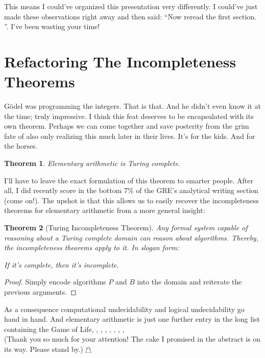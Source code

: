 \documentclass{article}
\newtheorem{theorem}{Theorem}
\begin{document}
This means I could've organized this presentation very differently. I could've just made these observations right away and then said: ``Now reread the first section. \scalebox{0.9}{$\square$}''. I've been wasting your time!

\section{Refactoring The Incompleteness Theorems}

Gödel was programming the integers. That is that. And he didn't even know it at the time; truly impressive. I think this feat deserves to be encapsulated with its own theorem. Perhaps we can come together and save posterity from the grim fate of also only realizing this much later in their lives. It's for the kids. And for the horses.

\begin{theorem}
Elementary arithmetic is Turing complete.
\end{theorem}

I'll have to leave the exact formulation of this theorem to smarter people. After all, I did recently score in the bottom 7\% of the GRE's analytical writing section (come on!). The upshot is that this allows us to easily recover the incompleteness theorems for elementary arithmetic from a more general insight:

\begin{theorem}[Turing Incompleteness Theorem]
Any formal system capable of reasoning about a Turing complete domain can reason about algorithms. Thereby, the incompleteness theorems apply to it. In slogan form: 
\begin{center}
If it's complete, then it's incomplete.
\end{center}
\end{theorem}

\begin{proof}
Simply encode algorithms $P$ and $B$ into the domain and reiterate the previous arguments.
\end{proof}

As a consequence computational undecidability and logical undecidability go hand in hand. And elementary arithmetic is just one further entry in the long list containing the Game of Life, \scalebox{0.95}{Fractran}, \scalebox{0.9}{Post Tag Systems}, \scalebox{0.85}{Magic the Gathering}, \scalebox{0.8}{the human brain}, \scalebox{0.75}{Rule 110}, \scalebox{0.7}{the Lambda Calculus}, \scalebox{0.65}{musical notation}, \scalebox{0.6}{...}\\[2em]
\footnotesize{(Thank you so much for your attention! The cake I promised in the abstract is on its way. Please stand by.) $\mathghost$}
\end{document}
